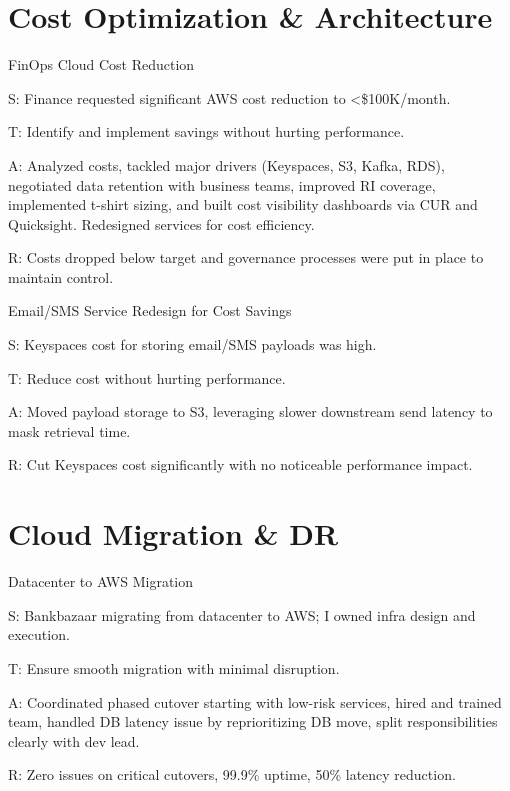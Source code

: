 \documentclass[11pt]{article}
\begin{document}
\section{Cost Optimization \& Architecture}

\begin{starstory}{FinOps Cloud Cost Reduction}
\begin{starlist}
\item[S:] Finance requested significant AWS cost reduction to <\$100K/month.
\item[T:] Identify and implement savings without hurting performance.
\item[A:] Analyzed costs, tackled major drivers (Keyspaces, S3, Kafka, RDS), negotiated data retention with business teams, improved RI coverage, implemented t-shirt sizing, and built cost visibility dashboards via CUR and Quicksight. Redesigned services for cost efficiency.
\item[R:] Costs dropped below target and governance processes were put in place to maintain control.
\end{starlist}
\end{starstory}

\begin{starstory}{Email/SMS Service Redesign for Cost Savings}
\begin{starlist}
\item[S:] Keyspaces cost for storing email/SMS payloads was high.
\item[T:] Reduce cost without hurting performance.
\item[A:] Moved payload storage to S3, leveraging slower downstream send latency to mask retrieval time.
\item[R:] Cut Keyspaces cost significantly with no noticeable performance impact.
\end{starlist}
\end{starstory}

\section{Cloud Migration \& DR}

\begin{starstory}{Datacenter to AWS Migration}
\begin{starlist}
\item[S:] Bankbazaar migrating from datacenter to AWS; I owned infra design and execution.
\item[T:] Ensure smooth migration with minimal disruption.
\item[A:] Coordinated phased cutover starting with low-risk services, hired and trained team, handled DB latency issue by reprioritizing DB move, split responsibilities clearly with dev lead.
\item[R:] Zero issues on critical cutovers, 99.9\% uptime, 50\% latency reduction.
\end{starlist}
\end{starstory}
\end{document}

